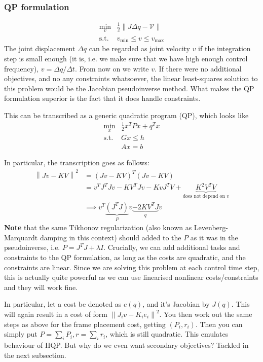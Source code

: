 \subsubsection{QP formulation}
\label{qp-formulation}
\begin{align}
		\min_{v} &\frac{1}{2} \left\lVert J \Delta q - \mathcal{V} \right \rVert  \\
		\text{s.t. } & v_{ \min } \leq v \leq v_{ \max }
\end{align}
The joint displacement $ \Delta q  $ can be regarded as joint velocity $ v  $
if the integration step is small enough (it is, i.e. we make sure 
that we have high enough control frequency),
$v = \Delta q/\Delta t$.
From now on we write $ v  $.
If there were no additional objectives, and no any constraints whatsoever,
the linear least-squares solution to this problem would be the Jacobian pseudoinverse method.
What makes the QP formulation superior is the fact that it does handle constraints.

This can be transcribed as a generic quadratic program (QP), which looks like
\begin{align}
		\min_{x} & \frac{1}{2} x^{ T } P x + q^{ T }x \\
		\text{s.t. } & Gx \leq h\\
					 & Ax = b
\end{align}

In particular, the transcription goes as follows:
\begin{align}
		\left\lVert J v - K V \right \rVert ^{ 2 } &=
		\left( J v - K V \right) ^{ T } \left( J v - K V \right) \\
&=
		v^{ T }J^{ T }Jv - KV^{ T }Jv - KvJ^{ T }V + 
		\underbrace{  K^{ 2 }V^{ T }V}_{\text{does not depend on }v} \\
		 &\implies v^{ T } \underbrace{  (J^{ T }J)}_{P}v 
	 \underbrace{  - 2 KV^{ T }J}_{q} v
\end{align}
\textbf{Note} that the same Tikhonov regularization (also known as Levenberg-Marquardt damping
in this context) 
should added to the $ P  $ as it was in the pseudoinverse, i.e.
$ P = J^{ T }J + \lambda I $.
Crucially, we can add additional tasks and constraints to the QP formulation,
as long as the costs are quadratic, and the constraints are linear.
Since we are solving this problem at each control time step, 
this is actually quite powerful as we can use linearised nonlinear costs/constraints
and they will work fine.

In particular, let a cost be denoted as $ e (q)  $,
and it's Jacobian by $ J (q)  $.
This will again result in a cost of form
$ \left\lVert J_{ i } v - K_{ i }e_{ i } \right \rVert ^{ 2 }  $.
You then work out the same steps as above for the frame placement cost, getting $ (P_{ i }, r_{ i })  $. 
Then you can simply put $ P = \sum_{i}^{} P_{ i }, r = \sum_{i}^{} r_{ i }  $,
which is still quadratic.
This emulates behaviour of HQP.
But why do we even want secondary objectives? Tackled in the next subsection.


